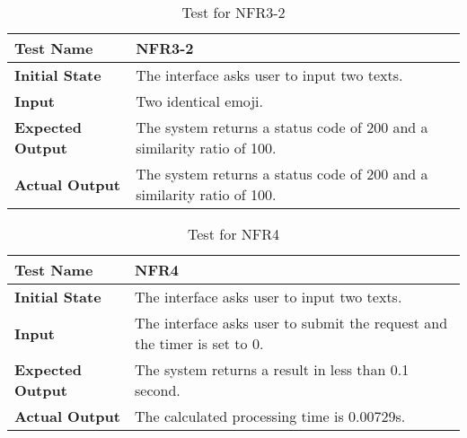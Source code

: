 \documentclass[12pt, titlepage]{article}
\begin{document}
		\begin{table}[H]
			
			\begin{tabular}[r]{|l|p{10cm}|}
				
				\hline
				
				\textbf{Test Name} & NFR3-2 \\ 
				\hline
				\textbf{Initial State} & The interface asks user to input two texts.\\ 
				\hline
				\textbf{Input} & Two identical emoji. \\ 
				\hline 
				\textbf{Expected Output} & The system returns a status code of 200 and a similarity ratio of 100.  \\ 
				\hline
				\textbf{Actual Output} & The system returns a status code of 200 and a similarity ratio of 100.  \\ 
				\hline
				
			\end{tabular}
			\caption{Test for NFR3-2}
			\label{Table}
		\end{table}
		
		\begin{table}[H]
			
			\begin{tabular}[r]{|l|p{10cm}|}
				
				\hline
				
				\textbf{Test Name} & NFR4 \\ 
				\hline
				\textbf{Initial State} & The interface asks user to input two texts.\\ 
				\hline
				\textbf{Input} & The interface asks user to submit the request and the timer is set to 0. \\ 
				\hline 
				\textbf{Expected Output} & The system returns a result in less than 0.1 second.  \\ 
				\hline
				\textbf{Actual Output} & The calculated processing time is 0.00729s.  \\ 
				\hline
				
			\end{tabular}
			\caption{Test for NFR4}
			\label{Table}
		\end{table}
		
\end{document}
